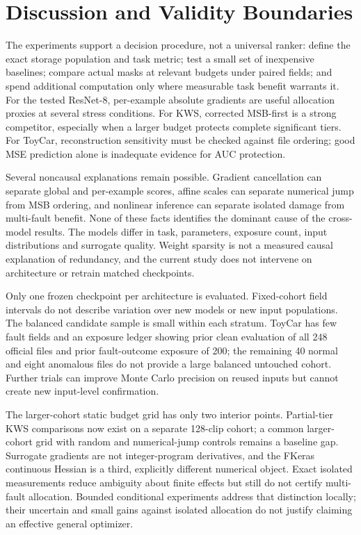 \section{Discussion and Validity Boundaries}
The experiments support a decision procedure, not a universal ranker: define the
exact storage population and task metric; test a small set of inexpensive
baselines; compare actual masks at relevant budgets under paired fields; and
spend additional computation only where measurable task benefit warrants it.
For the tested ResNet-8, per-example absolute gradients are useful allocation
proxies at several stress conditions. For KWS, corrected MSB-first is a strong
competitor, especially when a larger budget protects complete significant tiers.
For ToyCar, reconstruction sensitivity must be checked against file ordering;
good MSE prediction alone is inadequate evidence for AUC protection.

Several noncausal explanations remain possible. Gradient cancellation can
separate global and per-example scores, affine scales can separate numerical
jump from MSB ordering, and nonlinear inference can separate isolated damage
from multi-fault benefit. None of these facts identifies the dominant cause of
the cross-model results. The models differ in task, parameters, exposure count,
input distributions and surrogate quality. Weight sparsity is not a measured
causal explanation of redundancy, and the current study does not intervene on
architecture or retrain matched checkpoints.

Only one frozen checkpoint per architecture is evaluated. Fixed-cohort field
intervals do not describe variation over new models or new input populations.
The balanced candidate sample is small within each stratum. ToyCar has few
fault fields and an exposure ledger showing prior clean evaluation of all 248
official files and prior fault-outcome exposure of 200; the remaining 40 normal
and eight anomalous files do not provide a large balanced untouched cohort.
Further trials can improve Monte Carlo precision on reused inputs but cannot
create new input-level confirmation.

The larger-cohort static budget grid has only two interior points. Partial-tier
KWS comparisons now exist on a separate 128-clip cohort; a common larger-cohort
grid with random and numerical-jump controls remains a baseline gap. Surrogate
gradients are not integer-program derivatives, and the FKeras continuous
Hessian is a third, explicitly different numerical object. Exact isolated
measurements reduce ambiguity about finite effects but still do not certify
multi-fault allocation. Bounded conditional experiments address that distinction
locally; their uncertain and small gains against isolated allocation do not
justify claiming an effective general optimizer.

